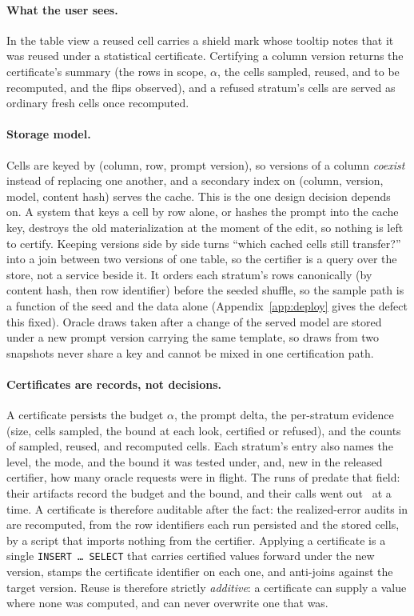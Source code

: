 \keeprunin
\paragraph{What the user sees.} In the table view a reused cell
carries a shield mark whose tooltip notes that it was reused under a
statistical certificate. Certifying a column version returns the
certificate's summary (the rows in scope, $\alpha$, the cells sampled,
reused, and to be recomputed, and the flips observed), and a refused
stratum's cells are served as ordinary fresh cells once recomputed.


\keeprunin
\paragraph{Storage model.} Cells are keyed by
(column, row, prompt version), so versions of a column \emph{coexist}
instead of replacing one another, and a secondary index on
(column, version, model, content hash) serves the cache. This is the one
design decision \sivm{} depends on. A system that keys a cell by row
alone, or hashes the prompt into the cache key, destroys the old
materialization at the moment of the edit, so nothing is left to certify.
Keeping versions side by side turns ``which cached cells still
transfer?'' into a join between two versions of one table, so the
certifier is a query over the store, not a service beside it. It orders
each stratum's rows canonically (by content hash, then row identifier)
before the seeded shuffle, so the sample path is a function of the seed
and the data alone (Appendix~\ref{app:deploy} gives the defect this
fixed). Oracle draws taken after a change of the
served model are stored under a new prompt version carrying the same
template, so draws from two snapshots never share a key and cannot be
mixed in one certification path.

\keeprunin
\paragraph{Certificates are records, not decisions.} A certificate
persists the budget $\alpha$, the prompt delta, the per-stratum evidence
(size, cells sampled, the bound at each look, certified or refused),
and the counts of sampled, reused, and recomputed cells. Each stratum's
entry also names the level, the mode, and the bound it was tested
under, and, new in the released certifier, how many oracle requests
were in flight. The runs of  predate that field: their
artifacts record the budget and the bound, and their calls went out
\deployConcurrency\ at a time.
A certificate is therefore auditable after the fact: the realized-error
audits in  are recomputed, from the row
identifiers each run persisted and the stored cells, by a script that
imports nothing from the certifier. Applying a certificate is a single
\texttt{INSERT\,\dots\,SELECT} that carries certified values forward
under the new version, stamps the certificate identifier on each one,
and anti-joins against the target version. Reuse is therefore strictly
\emph{additive}: a certificate can supply a value where none was
computed, and can never overwrite one that was.


